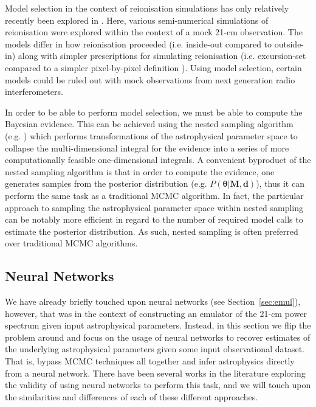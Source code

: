 Model selection in the context of reionisation simulations has only relatively recently been explored in \cite{Binnie:2019}. Here, various semi-numerical simulations of reionisation were explored within the context of a mock 21-cm observation. The models differ in how reionisation proceeded (i.e. inside-out compared to outside-in) along with simpler prescriptions for simulating reionisation (i.e. excursion-set compared to a simpler pixel-by-pixel definition \cite{MiraldaEscude:2000}). Using model selection, certain models could be ruled out with mock observations from next generation radio interferometers.

In order to be able to perform model selection, we must be able to compute the Bayesian evidence. This can be achieved using the nested sampling algorithm (e.g. \cite{Skilling:2004}) which performs transformations of the astrophysical parameter space to collapse the multi-dimensional integral for the evidence into a series of more computationally feasible one-dimensional integrals. A convenient byproduct of the nested sampling algorithm is that in order to compute the evidence, one generates samples from the posterior distribution (e.g. $P(\mathbf{\theta}|\mathbf{M},\mathbf{d})$), thus it can perform the same task as a traditional MCMC algorithm. In fact, the particular approach to sampling the astrophysical parameter space within nested sampling can be notably more efficient in regard to the number of required model calls to estimate the posterior distribution. As such, nested sampling is often preferred over traditional MCMC algorithms.

\subsection{Neural Networks} \label{sec:NN}

We have already briefly touched upon neural networks (see Section~\ref{sec:emul}), however, that was in the context of constructing an emulator of the 21-cm power spectrum given input astrophysical parameters. Instead, in this section we flip the problem around and focus on the usage of neural networks to recover estimates of the underlying astrophysical parameters given some input observational dataset. That is, bypass MCMC techniques all together and infer astrophysics directly from a neural network. There have been several works in the literature exploring the validity of using neural networks to perform this task, and we will touch upon the similarities and differences of each of these different approaches.

